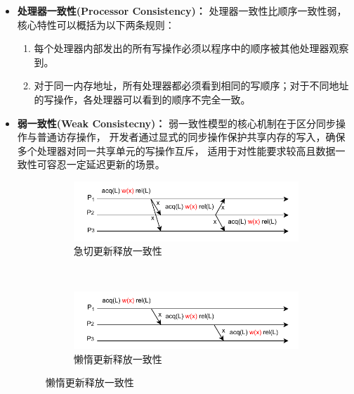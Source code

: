 {\begin{itemize}
        \item \textbf{处理器一致性(Processor Consistency)：} 处理器一致性比顺序一致性弱，核心特性可以概括为以下两条规则：
              \begin{enumerate}[label=\arabic*.]
                  \item 每个处理器内部发出的所有写操作必须以程序中的顺序被其他处理器观察到。
                  \item 对于同一内存地址，所有处理器都必须看到相同的写顺序；对于不同地址的写操作，各处理器可以看到的顺序不完全一致。
              \end{enumerate}

        \item \textbf{弱一致性(Weak Consistecny)：} 弱一致性模型的核心机制在于区分同步操作与普通访存操作，
              开发者通过显式的同步操作保护共享内存的写入，确保多个处理器对同一共享单元的写操作互斥，
              适用于对性能要求较高且数据一致性可容忍一定延迟更新的场景。

              \begin{figure}[!htbp]
                  \centering
                  \begin{subfigure}[b]{0.8\textwidth}
                      \includegraphics[width=\textwidth]{Img/急切更新释放一致性.drawio.pdf}
                      \caption{急切更新释放一致性}
                      \label{fig:eager-release-consistency}
                  \end{subfigure}
                  \\
                  \begin{subfigure}[b]{0.8\textwidth}
                      \includegraphics[width=\textwidth]{Img/懒惰更新释放一致性.drawio.pdf}
                      \caption{懒惰更新释放一致性}
                      \label{fig:lazy-release-consistency}
                  \end{subfigure}


\end{figure}
\end{itemize}}
